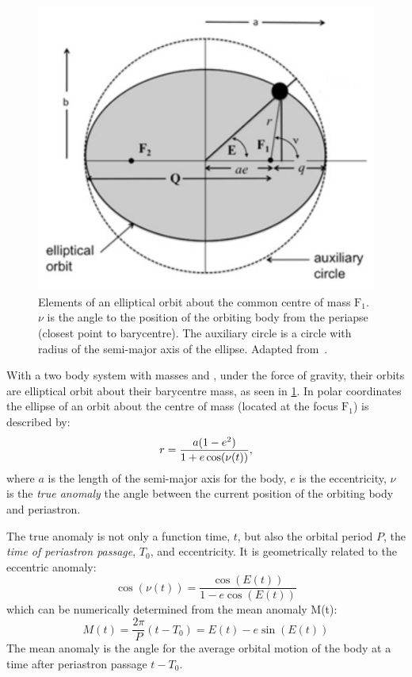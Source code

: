 \begin{figure}
    \centering
    \includegraphics[width=0.7\linewidth]{figures/fundamental_rv/eclipes_orbit2}
    \caption{Elements of an elliptical orbit about the common centre of mass \(\textrm{F}_1\). {\(\nu\)} is the angle to the position of the orbiting body from the periapse (closest point to barycentre). The auxiliary circle is a circle with radius of the semi-major axis of the ellipse. Adapted from~\citep{bozza_methods_2016}.}
    \label{fig:eclipesorbit}
\end{figure}

With a two body system with masses \Mone{} and \Mtwo{}, under the force of gravity, their orbits are elliptical orbit about their barycentre mass, as seen in \cref{fig:eclipesorbit}.
In polar coordinates the ellipse of an orbit about the centre of mass (located at the focus $\textrm{F}_1$) is described by:
\begin{equation}
    r = \frac{a(1 - {e}^{2})}{1 + e \cos(\nu(t))},
\end{equation}
where $a$ is the length of the semi-major axis for the body, $e$ is the eccentricity, $\nu$ is the \emph{true anomaly} the angle between the current position of the orbiting body and periastron.

The true anomaly is not only a function time, \(t\), but also the orbital period \(P\), the \emph{time of periastron passage}, \(T_0\), and eccentricity.
It is geometrically related to the eccentric anomaly:
\begin{equation}
    \cos(\nu(t)) = \frac{\cos(E(t))}{1 - e \cos(E(t))}
\end{equation} 
which can be numerically determined from the mean anomaly M(t):
\begin{equation}
    M(t) = \frac{2 \pi}{P}(t - T_0) = E(t) - e \sin(E(t))
\end{equation}
The mean anomaly is the angle for the average orbital motion of the body at a time after periastron passage \(t-T_0\).



